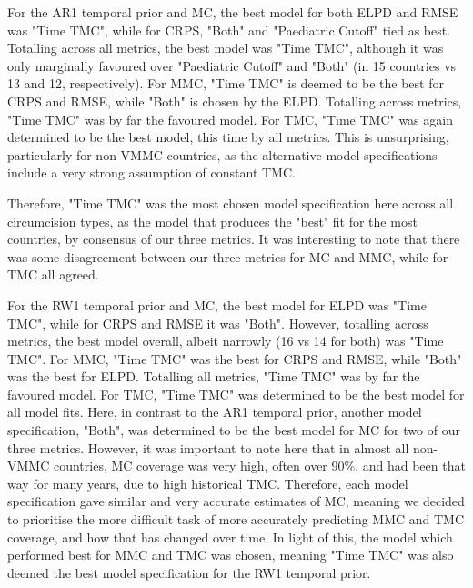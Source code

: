 \documentclass{article}
\begin{document}

\vspace{10 mm}

For the AR1 temporal prior and MC, the best model for both ELPD and RMSE was "Time TMC", while for CRPS, "Both" and "Paediatric Cutoff" tied as best.
Totalling across all metrics, the best model was "Time TMC", although it was only marginally favoured over "Paediatric Cutoff" and "Both" (in 15 countries vs 13 and 12, respectively).  
For MMC, "Time TMC" is deemed to be the best for CRPS and RMSE, while "Both" is chosen by the ELPD. Totalling across metrics, "Time TMC" was by far the favoured model. 
For TMC, "Time TMC" was again determined to be the best model, this time by all metrics. This is unsurprising, particularly for non-VMMC countries, as the alternative model specifications include a very strong assumption of constant TMC. 

Therefore, "Time TMC" was the most chosen model specification here across all circumcision types, as the model that produces the "best" fit for the most countries, by consensus of our three metrics.
It was interesting to note that there was some disagreement between our three metrics for MC and MMC, while for TMC all agreed.

For the RW1 temporal prior and MC, the best model for ELPD was "Time TMC", while for CRPS and RMSE it was "Both". However, totalling across metrics, the best model overall, albeit narrowly (16 vs 14 for both) was "Time TMC".
For MMC, "Time TMC" was the best for CRPS and RMSE, while "Both" was the best for ELPD. Totalling all metrics, "Time TMC" was by far the favoured model. 
For TMC, "Time TMC" was determined to be the best model for all model fits. 
Here, in contrast to the AR1 temporal prior, another model specification, "Both", was determined to be the best model for MC for two of our three metrics. 
However, it was important to note here that in almost all non-VMMC countries, MC coverage was very high, often over 90\%, and had been that way for many years, due to high historical TMC. Therefore, each model specification gave similar and very accurate estimates of MC, meaning we decided to prioritise the more difficult task of more accurately predicting MMC and TMC coverage, and how that has changed over time. 
In light of this, the model which performed best for MMC and TMC was chosen, meaning "Time TMC" was also deemed the best model specification for the RW1 temporal prior. 
\end{document}
